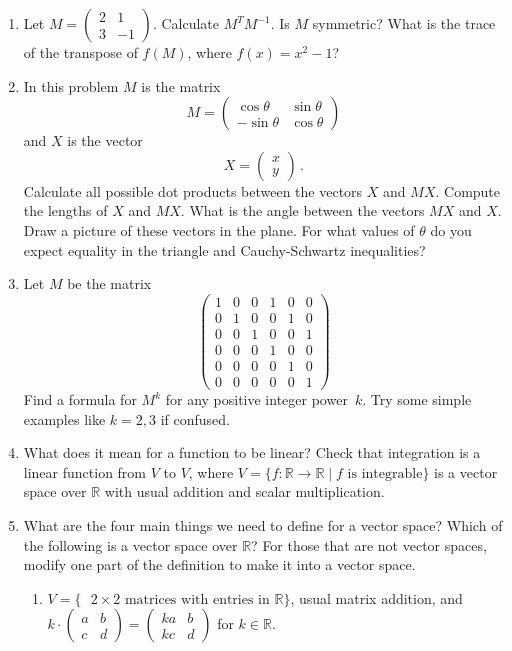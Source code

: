 \begin{enumerate}
\item Let $M = \left ( \begin{array}{cc} 2 & 1 \\ 3 & -1 \end{array}  \right )$.  Calculate $M^TM^{-1}$.  Is $M$ symmetric?  What is the trace of the transpose of $f(M)$, where $f(x) = x^2 -1$?

\item In this problem $M$ is the matrix
\[
M=\begin{pmatrix}\cos\theta & \sin\theta \\ -\sin\theta&\cos\theta\end{pmatrix}
\]
and $X$ is the vector
\[
X=\begin{pmatrix}x\\y \end{pmatrix}\, .
\]
Calculate all possible dot products between the vectors $X$ and $MX$. Compute the lengths of $X$ and $MX$.
What is the angle between the vectors $MX$ and $X$. Draw a picture of these vectors in the plane. For what values
of $\theta$ do you expect equality in the triangle and Cauchy-Schwartz inequalities?

\item Let $M$ be the matrix
\[
\begin{pmatrix}
1&0&0&1&0&0\\
0&1&0&0&1&0\\
0&0&1&0&0&1\\
0&0&0&1&0&0\\
0&0&0&0&1&0\\
0&0&0&0&0&1
\end{pmatrix}
\]
Find a formula for $M^k$ for any positive integer power~$k$. Try some simple examples like $k=2,3$ if confused.



\item What does it mean for a function to be linear?  Check that integration is a linear function from $V$ to $V$, where $V = \{ f: \mathbb{R} \to \mathbb{R} \mid f \textrm{ is integrable}\}$ is a vector space over $\mathbb{R}$ with usual addition and scalar multiplication.


\item What are the four main things we need to define for a vector space?  Which of the following is a vector space over $\mathbb{R}$?  For those that are not vector spaces, modify one part of the definition to make it into a vector space.
\begin{enumerate}
\item $V = \{ \textrm{ $2 \times 2$ matrices with entries in $\mathbb{R}$} \}$, usual matrix addition, and $k \cdot \left ( \begin{array}{cc} a & b \\ c & d \end{array}  \right ) = \left ( \begin{array}{cc} ka & b \\ kc & d \end{array}  \right )$ for $k \in \mathbb{R}$.


\end{enumerate}
\end{enumerate}

